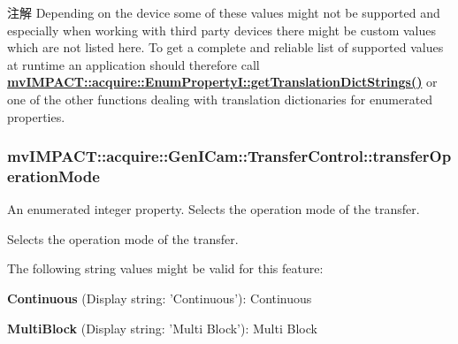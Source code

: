 \begin{DoxyNote}{注解}
Depending on the device some of these values might not be supported and especially when working with third party devices there might be custom values which are not listed here. To get a complete and reliable list of supported values at runtime an application should therefore call {\bfseries \hyperlink{classmv_i_m_p_a_c_t_1_1acquire_1_1_enum_property_i_a0ba6ccbf5ee69784d5d0b537924d26b6}{mv\+I\+M\+P\+A\+C\+T\+::acquire\+::\+Enum\+Property\+I\+::get\+Translation\+Dict\+Strings()}} or one of the other functions dealing with translation dictionaries for enumerated properties. 
\end{DoxyNote}
\hypertarget{classmv_i_m_p_a_c_t_1_1acquire_1_1_gen_i_cam_1_1_transfer_control_a5f60d36f9fab02b1519901c371f376ad}{
\subsubsection[{transfer\+Operation\+Mode}]{ mv\+I\+M\+P\+A\+C\+T\+::acquire\+::\+Gen\+I\+Cam\+::\+Transfer\+Control\+::transfer\+Operation\+Mode}}\label{classmv_i_m_p_a_c_t_1_1acquire_1_1_gen_i_cam_1_1_transfer_control_a5f60d36f9fab02b1519901c371f376ad}


An enumerated integer property. Selects the operation mode of the transfer. 

Selects the operation mode of the transfer.

The following string values might be valid for this feature\+:
\begin{DoxyItemize}
\item {\bfseries Continuous} (Display string\+: 'Continuous')\+: Continuous
\item {\bfseries Multi\+Block} (Display string\+: 'Multi Block')\+: Multi Block
\end{DoxyItemize}

